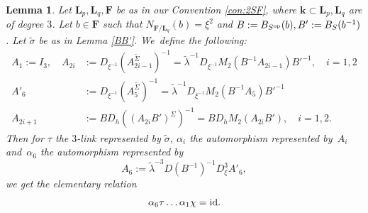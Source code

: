 \documentclass[JEP,XML,SOM,Unicode,NoFloatCountersInSection, NoEqCountersInSection,published]{cedram}
\newcommand{\id}{\textup{id}}
\newcommand{\op}{\textup{op}}
\newtheorem{lemma}[theorem]{Lemma}
\theoremstyle{definition}
\newcommand{\kk}{{\boldsymbol{k}}}
\newcommand{\FF}{{\boldsymbol{F}}}
\newcommand{\LL}{{\boldsymbol{L}}}
\begin{document}
\begin{lemma} \label{HardRel}
Let $\LL_p, \LL_q,\FF$ be as in our Convention \ref{con:2SF}, where $\kk \subset \LL_p, \LL_q$ are of degree $3$. Let $b \in \FF$ such that $N_{\FF/\LL_q}(b) = \xi^2$ and $B:= B_{S^{\op}}(b), B':= B_S(b^{-1})$. Let $\tilde \sigma$ be as in Lemma \ref{BB'}. We~define the following:
\begin{align*}
A_1 := I_3, \quad A_{2i} &:= D_{\xi^{-1}} (A_{2i-1}^{\tilde \Sigma})^{-1} = \tilde \lambda^{-1} D_{\xi^{-1}} M_2(B^{-1} A_{2i - 1})B'^{-1}, \quad i = 1,2
\\
A'_{6} &:= D_{\xi^{-1}} (A_{5}^{\tilde \Sigma})^{-1} = \tilde \lambda^{-1} D_{\xi^{-1}} M_2(B^{-1} A_{5})B'^{-1}
\\
\tag*{and}
A_{2i + 1} &:= B D_h ((A_{2i}B')^{\Sigma})^{-1} = B D_h M_2(A_{2i}B'), \quad i=1,2.
\end{align*}
Then for $\tau$ the $3$\nobreakdash-link represented by $\tilde \sigma$, $\alpha_i$ the automorphism represented by~$A_i$ and~$\alpha_6$ the automorphism represented by\vspace*{-3pt}
\[
A_6 := \tilde \lambda^{-3}D(B^{-1})^{-1}D_{\xi}^3 A'_6,
\]
we get the elementary relation\vspace*{-3pt}
\[
\alpha_6 \tau \dots \alpha_1 \chi = \id.
\]
\end{lemma}
\end{document}
